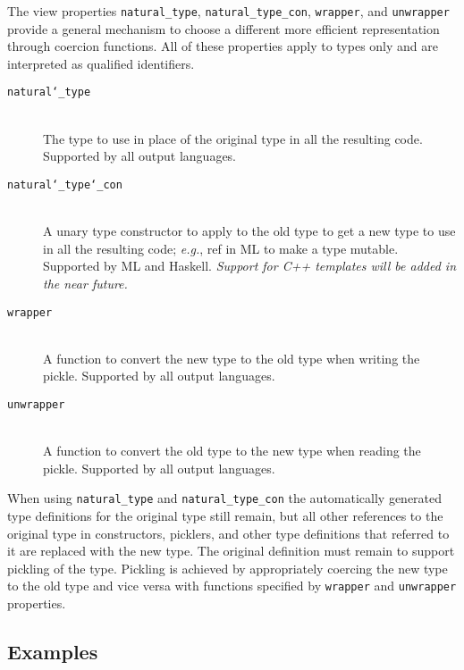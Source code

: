The view properties \lstinline!natural_type!, \lstinline!natural_type_con!, \lstinline!wrapper!,
and \lstinline!unwrapper! provide a general mechanism to choose a different
more efficient representation through coercion functions. All of these
properties apply to types only and are interpreted as qualified identifiers.

\begin{description} 
  \item[\texttt{natural\char`\_type}] \mbox{} \\
    The type to use in place of the original type in all the resulting code. 
    Supported by all output languages.

  \item[\texttt{natural\char`\_type\char`\_con}] \mbox{} \\
    A unary type constructor to apply to the old type to get a new type to
    use in all the resulting code; \textit{e.g.}, ref in ML to make a type
    mutable. Supported by ML and Haskell.  \emph{Support for C++ templates
    will be added in the near future.}

  \item[\texttt{wrapper}] \mbox{} \\
    A function to convert the new type to the old type when writing the
    pickle. Supported by all output languages.

  \item[\texttt{unwrapper}] \mbox{} \\
    A function to convert the old type to the new type when reading the pickle. 
    Supported by all output languages. 
\end{description}%

When using \lstinline!natural_type! and \lstinline!natural_type_con! the automatically
generated type definitions for the original type still remain, but all other
references to the original type in constructors, picklers, and other type
definitions that referred to it are replaced with the new type. The original
definition must remain to support pickling of the type. Pickling is achieved
by appropriately coercing the new type to the old type and vice versa with
functions specified by \lstinline!wrapper! and \lstinline!unwrapper! properties.

\subsection{Examples}

